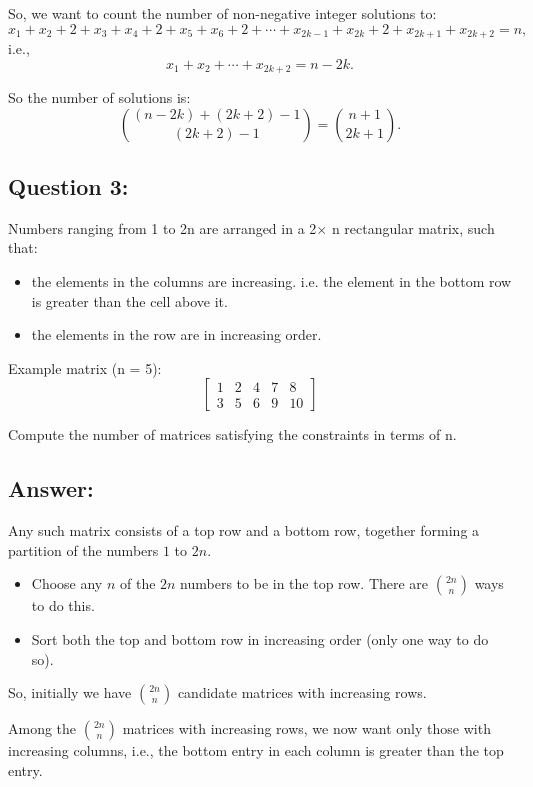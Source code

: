 \documentclass{article}
\begin{document}
So, we want to count the number of non-negative integer solutions to:
\[
x_1 + x_2 + 2 + x_3 + x_4 + 2 + x_5 + x_6 + 2 + \cdots + x_{2k-1} + x_{2k} + 2 + x_{2k+1} + x_{2k+2} = n,
\]
i.e.,
\[
x_1 + x_2 + \cdots + x_{2k+2} = n - 2k.
\]

So the number of solutions is:
\[
\binom{(n - 2k) + (2k + 2) - 1}{(2k + 2) - 1} = \binom{n + 1}{2k + 1}.
\]


\subsection*{Question 3:} Numbers ranging from 1 to 2n are arranged in a 2$\times$ n rectangular matrix, such that:
\begin{itemize}
    \item the elements in the columns are increasing. i.e. the element in the bottom row is greater than the cell above it.
    \item the elements in the row are in increasing order.
\end{itemize}

Example matrix (n = 5):
\[
\begin{bmatrix}
1 & 2 & 4 & 7 & 8 \\
3 & 5 & 6 & 9 & 10
\end{bmatrix}
\]

Compute the number of matrices satisfying the constraints in terms of n.

\subsection*{Answer:}

Any such matrix consists of a top row and a bottom row, together forming a partition of the numbers $1$ to $2n$.

\begin{itemize}
    \item Choose any $n$ of the $2n$ numbers to be in the top row. There are $\binom{2n}{n}$ ways to do this.
    \item Sort both the top and bottom row in increasing order (only one way to do so).
\end{itemize}

So, initially we have $\binom{2n}{n}$ candidate matrices with increasing rows.

Among the $\binom{2n}{n}$ matrices with increasing rows, we now want only those with increasing columns, i.e., the bottom entry in each column is greater than the top entry.
\end{document}
